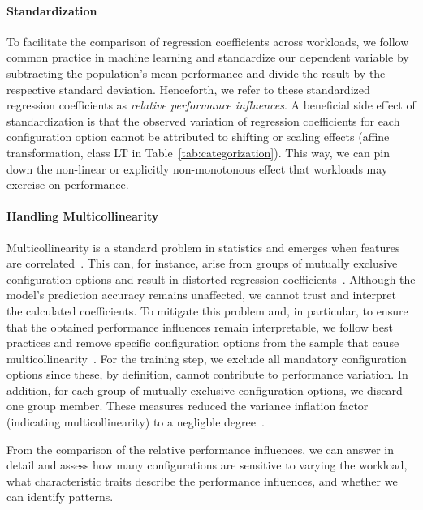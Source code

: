 {\paragraph*{Standardization}
To facilitate the comparison of regression coefficients across workloads, we follow common practice in machine learning and standardize our dependent variable by subtracting the population’s mean performance and divide the result by the respective standard deviation. Henceforth, we refer to these standardized regression coefficients as \textit{relative performance influences}. A beneficial side effect of standardization is that the observed variation of regression coefficients for each configuration option cannot be attributed to shifting or scaling effects (affine transformation, class \colorbox{lt-color}{\textsf{LT}} in Table~\ref{tab:categorization}). This way, we can pin down  the non-linear or explicitly non-monotonous effect that workloads may exercise on performance.
\paragraph*{Handling Multicollinearity} Multicollinearity is a standard problem in statistics and emerges when features are correlated~\cite{Daoud_2017}. This can, for instance, arise from groups of mutually exclusive configuration options and result in distorted regression coefficients~\cite{dorn2020}. Although the model's prediction accuracy remains unaffected, we cannot trust and interpret the calculated coefficients. To mitigate this problem and, in particular, to ensure that the obtained performance influences remain interpretable, we follow best practices and remove specific configuration options from the sample that cause multicollinearity~\cite{dorn2020}. For the training step, we exclude all mandatory configuration options since these, by definition, cannot contribute to performance variation. In addition, for each group of mutually exclusive configuration options, we discard one group member. These measures reduced the variance inflation factor (indicating multicollinearity) to a negligble degree~\cite{o2007caution}.

From the comparison of the relative performance influences, we can answer  in detail and assess how many configurations are sensitive to varying the workload, what characteristic traits describe the performance influences, and whether we can identify patterns.
}
